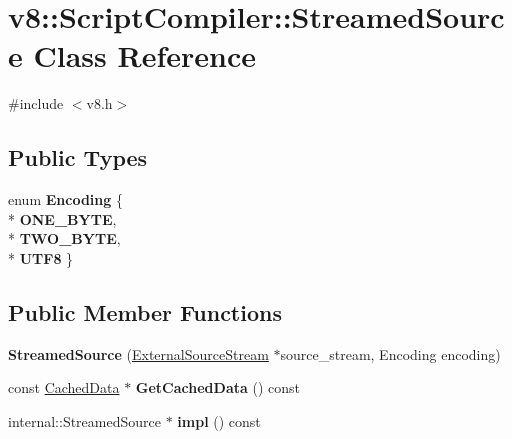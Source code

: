 \hypertarget{classv8_1_1_script_compiler_1_1_streamed_source}{}\section{v8\+:\+:Script\+Compiler\+:\+:Streamed\+Source Class Reference}
\label{classv8_1_1_script_compiler_1_1_streamed_source}


{\ttfamily \#include $<$v8.\+h$>$}

\subsection*{Public Types}
\begin{DoxyCompactItemize}
\item 
enum {\bfseries Encoding} \{ \\*
{\bfseries O\+N\+E\+\_\+\+B\+Y\+TE}, 
\\*
{\bfseries T\+W\+O\+\_\+\+B\+Y\+TE}, 
\\*
{\bfseries U\+T\+F8}
 \}\hypertarget{classv8_1_1_script_compiler_1_1_streamed_source_a17b52f85ac22120e687b16357d662da2}{}\label{classv8_1_1_script_compiler_1_1_streamed_source_a17b52f85ac22120e687b16357d662da2}

\end{DoxyCompactItemize}
\subsection*{Public Member Functions}
\begin{DoxyCompactItemize}
\item 
{\bfseries Streamed\+Source} (\hyperlink{classv8_1_1_script_compiler_1_1_external_source_stream}{External\+Source\+Stream} $\ast$source\+\_\+stream, Encoding encoding)\hypertarget{classv8_1_1_script_compiler_1_1_streamed_source_a4da404a49e48a12927c743797833d8aa}{}\label{classv8_1_1_script_compiler_1_1_streamed_source_a4da404a49e48a12927c743797833d8aa}

\item 
const \hyperlink{structv8_1_1_script_compiler_1_1_cached_data}{Cached\+Data} $\ast$ {\bfseries Get\+Cached\+Data} () const \hypertarget{classv8_1_1_script_compiler_1_1_streamed_source_a845dc408f6e2f98e51d6525836982873}{}\label{classv8_1_1_script_compiler_1_1_streamed_source_a845dc408f6e2f98e51d6525836982873}

\item 
internal\+::\+Streamed\+Source $\ast$ {\bfseries impl} () const \hypertarget{classv8_1_1_script_compiler_1_1_streamed_source_a60c3aa01ea04a6cd1aa1b7a5edb74c2b}{}\label{classv8_1_1_script_compiler_1_1_streamed_source_a60c3aa01ea04a6cd1aa1b7a5edb74c2b}

\end{DoxyCompactItemize}
